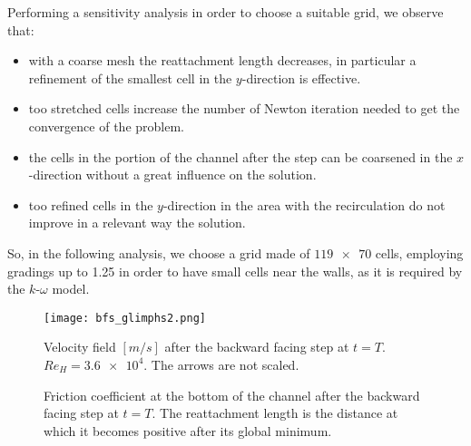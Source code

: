 Performing a sensitivity analysis in order to choose a suitable grid, we observe that:
\begin{itemize}
	\item with a coarse mesh the reattachment length decreases, in particular a refinement of the smallest cell in the $y$-direction is effective.
	\item too stretched cells increase the number of Newton iteration needed to get the convergence of the problem.
	\item the cells in the portion of the channel after the step can be coarsened in the $x$-direction without a great influence on the solution.
	\item too refined cells in the $y$-direction in the area with the recirculation do not improve in a relevant way the solution.
\end{itemize}
So, in the following analysis, we choose a grid made of $\num{119x70}$ cells, employing gradings up to 1.25 in order to have small cells near the walls, as it is required by the $k\text{-}\omega$ model.

\begin{figure} %
	\centering
	\texttt{[image: bfs\_glimphs2.png]}
	\caption[Velocity field after the backward facing step]{Velocity field $[\si{m/s}]$ after the backward facing step at $t=T$. $Re_H=\num{3.6e4}$. The arrows are not scaled.}
	\label{fig:bfsarrows}
\end{figure}
\begin{figure}
	\centering
	
	\caption[Friction coefficient in the backward facing step test]{Friction coefficient at the bottom of the channel after the backward facing step at $t=T$. The reattachment length is the distance at which it becomes positive after its global minimum.}
	\label{fig:bfscf}
\end{figure}

